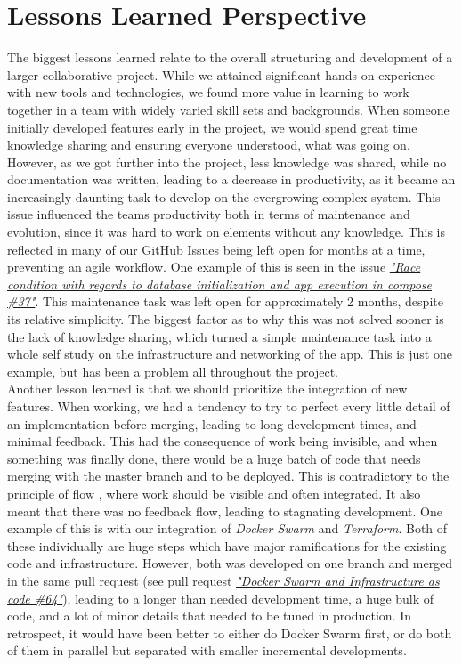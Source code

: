 \documentclass[11pt]{article}
\begin{document}
\section{Lessons Learned Perspective}
The biggest lessons learned relate to the overall structuring and development of a larger collaborative project. While we attained significant hands-on experience with new tools and technologies, we found more value in learning to work together in a team with widely varied skill sets and backgrounds. When someone initially developed features early in the project, we would spend great time knowledge sharing and ensuring everyone understood, what was going on. However, as we got further into the project, less knowledge was shared, while no documentation was written, leading to a decrease in productivity, as it became an increasingly daunting task to develop on the evergrowing complex system. This issue influenced the teams productivity both in terms of maintenance and evolution, since it was hard to work on elements without any knowledge. This is reflected in many of our GitHub Issues being left open for months at a time, preventing an agile workflow. One example of this is seen in the issue \href{https://github.com/group-o-minitwit-2024/MiniTwit/issues/37}{\textit{"Race condition with regards to database initialization and app execution in compose \#37"}}. This maintenance task was left open for approximately 2 months, despite its relative simplicity. The biggest factor as to why this was not solved sooner is the lack of knowledge sharing, which turned a simple maintenance task into a whole self study on the infrastructure and networking of the app. This is just one example, but has been a problem all throughout the project. \\

Another lesson learned is that we should prioritize the integration of new features. When working, we had a tendency to try to perfect every little detail of an implementation before merging, leading to long development times, and minimal feedback. This had the consequence of work being invisible, and when something was finally done, there would be a huge batch of code that needs merging with the master branch and to be deployed. This is contradictory to the principle of flow \citep{devops_handbook}, where work should be visible and often integrated. It also meant that there was no feedback flow, leading to stagnating development. One example of this is with our integration of \textit{Docker Swarm} and \textit{Terraform}. Both of these individually are huge steps which have major ramifications for the existing code and infrastructure. However, both was developed on one branch and merged in the same pull request (see pull request \href{https://github.com/group-o-minitwit-2024/MiniTwit/pull/64}{\textit{"Docker Swarm and Infrastructure as code \#64"}}), leading to a longer than needed development time, a huge bulk of code, and a lot of minor details that needed to be tuned in production. In retrospect, it would have been better to either do Docker Swarm first, or do both of them in parallel but separated with smaller incremental developments. \\
\end{document}

